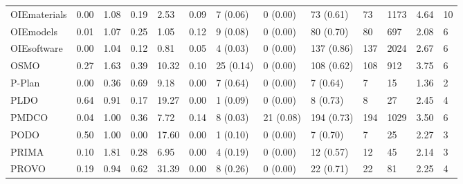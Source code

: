 \begin{table}
\begin{tabular}{m{3.5cm}m{2cm}m{2cm}m{2cm}m{2cm}m{2cm}m{2cm}m{2cm}m{2cm}m{2cm}m{2cm}m{2cm}m{2cm}}
OIEmaterials                &                0.00 &                  1.08 &                   0.19 &               2.53 &               0.09 &             7 (0.06) &   0 (0.00) &   73 (0.61) &   73 &            1173 &     4.64 &         10 \\
OIEmodels                   &                0.01 &                  1.07 &                   0.25 &               1.05 &               0.12 &             9 (0.08) &   0 (0.00) &   80 (0.70) &   80 &             697 &     2.08 &          6 \\
OIEsoftware                 &                0.00 &                  1.04 &                   0.12 &               0.81 &               0.05 &             4 (0.03) &   0 (0.00) &  137 (0.86) &  137 &            2024 &     2.67 &          6 \\
OSMO                        &                0.27 &                  1.63 &                   0.39 &              10.32 &               0.10 &            25 (0.14) &   0 (0.00) &  108 (0.62) &  108 &             912 &     3.75 &          6 \\
P-Plan                      &                0.00 &                  0.36 &                   0.69 &               9.18 &               0.00 &             7 (0.64) &   0 (0.00) &    7 (0.64) &    7 &              15 &     1.36 &          2 \\
PLDO                        &                0.64 &                  0.91 &                   0.17 &              19.27 &               0.00 &             1 (0.09) &   0 (0.00) &    8 (0.73) &    8 &              27 &     2.45 &          4 \\
PMDCO                       &                0.04 &                  1.00 &                   0.36 &               7.72 &               0.14 &             8 (0.03) &  21 (0.08) &  194 (0.73) &  194 &            1029 &     3.50 &          6 \\
PODO                        &                0.50 &                  1.00 &                   0.00 &              17.60 &               0.00 &             1 (0.10) &   0 (0.00) &    7 (0.70) &    7 &              25 &     2.27 &          3 \\
PRIMA                       &                0.10 &                  1.81 &                   0.28 &               6.95 &               0.00 &             4 (0.19) &   0 (0.00) &   12 (0.57) &   12 &              45 &     2.14 &          3 \\
PROVO                       &                0.19 &                  0.94 &                   0.62 &              31.39 &               0.00 &             8 (0.26) &   0 (0.00) &   22 (0.71) &   22 &              81 &     2.25 &          4 \\

\end{tabular}
\end{table}
